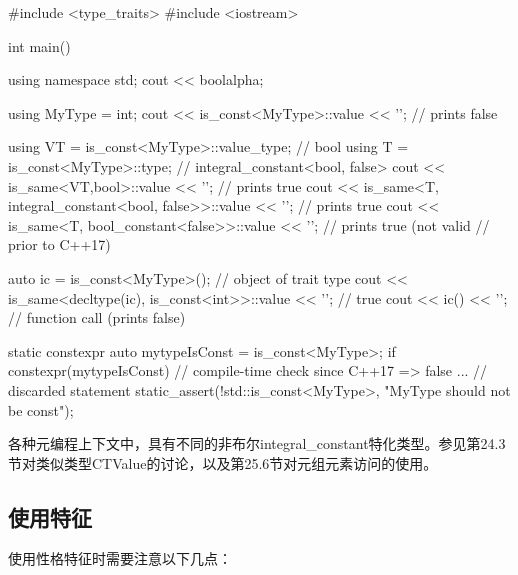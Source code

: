 \begin{cpp}
#include <type_traits>
#include <iostream>

int main() {
	using namespace std;
	cout << boolalpha;
	
	using MyType = int;
	cout << is_const<MyType>::value << '\n'; // prints false
	
	using VT = is_const<MyType>::value_type; // bool
	using T = is_const<MyType>::type; // integral_constant<bool, false>
	cout << is_same<VT,bool>::value << '\n'; // prints true
	cout << is_same<T, integral_constant<bool, false>>::value
		<< '\n'; // prints true
	cout << is_same<T, bool_constant<false>>::value
		<< '\n'; // prints true (not valid	
				// prior to C++17)
				
	auto ic = is_const<MyType>(); // object of trait type
	cout << is_same<decltype(ic), is_const<int>>::value << '\n'; // true
	cout << ic() << '\n'; // function call (prints false)
	
	static constexpr auto mytypeIsConst = is_const<MyType>{};
	if constexpr(mytypeIsConst) { // compile-time check since C++17 => false
		... // discarded statement
	}
	static_assert(!std::is_const<MyType>{}, "MyType should not be const");
}
\end{cpp}

各种元编程上下文中，具有不同的非布尔integral\_constant特化类型。参见第24.3节对类似类型CTValue的讨论，以及第25.6节对元组元素访问的使用。

\subsection{使用特征}

使用性格特征时需要注意以下几点：

